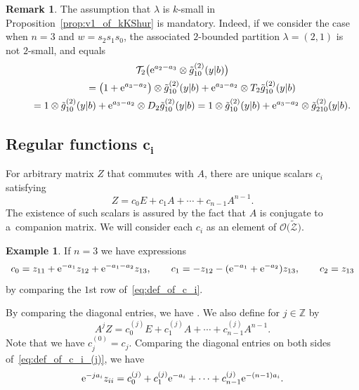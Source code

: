 \documentclass[pdftex]{sigma}
\numberwithin{equation}{section}
\newcommand{\Z}{\mathbb{Z}}
\theoremstyle{definition}
\newtheorem{Example}[Theorem]{Example}
\newtheorem{Remark}[Theorem]{Remark}
\begin{document}
\begin{Remark}
The assumption that $\lambda$ is $k$-small in Proposition~\ref{prop:v1_of_kKShur} is mandatory.
Indeed, if we consider the case when $n=3$ and $w=s_2s_1s_0$, the associated $2$-bounded partition $\lambda=(2,1)$ is not $2$-small, and
 equals
\begin{gather*}
\mathcal{T}_2\bigl({\rm e}^{a_2-a_3}\otimes \tilde{g}^{(2)}_{10}(y|b)\bigr)\\
\qquad
=\bigl(1+{\rm e}^{a_3-a_2}\bigr)\otimes \tilde{g}^{(2)}_{10}(y|b)+{\rm e}^{a_3-a_2}\otimes T_2\tilde{g}^{(2)}_{10}(y|b) \\
\qquad=1\otimes \tilde{g}^{(2)}_{10}(y|b)+{\rm e}^{a_3-a_2}\otimes D_2\tilde{g}^{(2)}_{10}(y|b)
=1\otimes \tilde{g}^{(2)}_{10}(y|b)+{\rm e}^{a_3-a_2}\otimes \tilde{g}^{(2)}_{210}(y|b).
\end{gather*}
\end{Remark}







\subsection[Regular functions c\_i]{Regular functions $\boldsymbol{c_i}$}\label{sec:ci}




For arbitrary matrix $Z$ that commutes with $A$, there are unique scalars $c_i$ satisfying
\begin{equation}\label{eq:def_of_c_i}
Z=c_0E+c_1A+\cdots+c_{n-1}A^{n-1}.
\end{equation} The existence of such
scalars is assured by the fact that $A$ is conjugate to a~companion matrix.
We will consider each $c_i$ as an element of $\mathscr{O}\bigl(\tilde{\mathscr{Z}}\bigr)$.

\begin{Example} If
$n=3$ we have expressions
\[
c_0=z_{11}+{\rm e}^{-a_1}z_{12}+{\rm e}^{-a_1-a_2}z_{13},\qquad
c_1=-z_{12}-({\rm e}^{-a_1}+{\rm e}^{-a_2})z_{13},\qquad
c_2=z_{13}
\]
by comparing the $1$st row of~\eqref{eq:def_of_c_i}.
\end{Example}




By comparing the diagonal
entries, we have
.
We also define 
for $j\in \Z$ by
\begin{equation}\label{eq:def_of_c_i_(j)}
A^jZ=c_0^{(j)}E+c_1^{(j)}A+\cdots+c_{n-1}^{(j)}A^{n-1}.
\end{equation}
Note that we have $c_j^{(0)}=c_j$.
Comparing the diagonal entries on both sides of~\eqref{eq:def_of_c_i_(j)}, we have
\begin{equation}
{\rm e}^{-ja_i}z_{ii}=c_0^{(j)}+c_1^{(j)} {\rm e}^{-a_i}+
\cdots+c_{n-1}^{(j)}{\rm e}^{-(n-1)a_i}.\label{eq:zii_c_2}
\end{equation}
\end{document}
